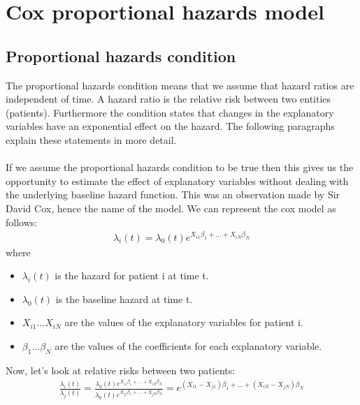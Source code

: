 \section{Cox proportional hazards model}
\label{sec:cox-proportional-hazards-model}
\subsection{Proportional hazards condition}
The proportional hazards condition means that we assume that hazard ratios are independent of time. A hazard ratio is the relative risk between two entities (patients). Furthermore the condition states that changes in the explanatory variables have an exponential effect on the hazard. The following paragraphs explain these statements in more detail.\\ \\
If we assume the proportional hazards condition to be true then this gives us the opportunity to estimate the effect of explanatory variables without dealing with the underlying baseline hazard function. This was an observation made by Sir David Cox\cite{cox1972life}, hence the name of the model. We can represent the cox model as follows:
\begin{equation}
\begin{split}
\lambda_{i}(t) = \lambda_{0}(t)e^{X_{i1}\beta_{1} + ... + X_{iN}\beta_{N}}
\end{split}
\end{equation}
where
\begin{itemize}
	\item $\lambda_{i}(t)$ is the hazard for patient i at time t.
	\item $\lambda_{0}(t)$ is the baseline hazard at time t.
	\item $X_{i1} ... X_{iN}$ are the values of the explanatory variables for patient i.
	\item $\beta_{1} ... \beta_{N}$ are the values of the coefficients for each explanatory variable.
\end{itemize}
Now, let's look at relative risks between two patients:
\begin{equation}
\begin{split}
\frac{\lambda_{i}(t)}{\lambda_{j}(t)} 
= \frac{\lambda_{0}(t)e^{X_{i1}\beta_{1} + ... + X_{iN}\beta_{N}}}{\lambda_{0}(t)e^{X_{j1}\beta_{1} + ... + X_{jN}\beta_{N}}}
= e^{(X_{i1}-X_{j1})\beta_{1} + ... + (X_{iN}-X_{jN})\beta_{N}}
\end{split}
\end{equation}
